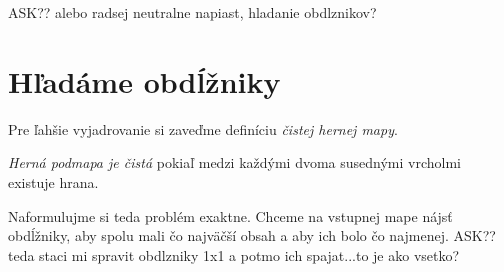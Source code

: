 ASK?? alebo radsej neutralne napiast, hladanie obdlznikov?
\section{Hľadáme obdĺžniky}

Pre ľahšie vyjadrovanie si zaveďme definíciu {\sl čistej hernej mapy}.

\begin{define}
{\sl Herná podmapa je čistá} 
pokiaľ medzi každými dvoma susednými vrcholmi existuje hrana.
\end{define}

Naformulujme si teda problém exaktne. Chceme na vstupnej mape nájsť obdĺžniky, aby spolu mali čo najväčší obsah a aby ich bolo čo najmenej.
ASK?? teda staci mi spravit obdlzniky 1x1 a potmo ich spajat...to je ako vsetko?